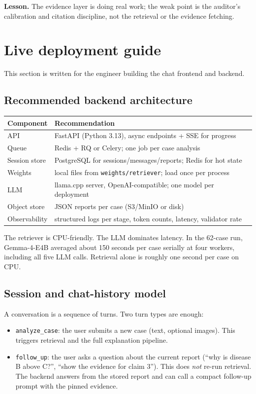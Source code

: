 \documentclass[11pt,a4paper]{article}
\newcommand{\code}[1]{\texttt{\small #1}}
\begin{document}
\textbf{Lesson.} The evidence layer is doing real work; the weak point is the
auditor's calibration and citation discipline, not the retrieval or the evidence
fetching.

\section{Live deployment guide}

This section is written for the engineer building the chat frontend and backend.

\subsection{Recommended backend architecture}

\begin{center}
\begin{tabular}{ll}
\toprule
Component & Recommendation\\
\midrule
API & FastAPI (Python 3.13), async endpoints + SSE for progress\\
Queue & Redis + RQ or Celery; one job per case analysis\\
Session store & PostgreSQL for sessions/messages/reports; Redis for hot state\\
Weights & local files from \code{weights/retriever}; load once per process\\
LLM & llama.cpp server, OpenAI-compatible; one model per deployment\\
Object store & JSON reports per case (S3/MinIO or disk)\\
Observability & structured logs per stage, token counts, latency, validator rate\\
\bottomrule
\end{tabular}
\end{center}

The retriever is CPU-friendly. The LLM dominates latency. In the 62-case run,
Gemma-4-E4B averaged about 150 seconds per case serially at four workers, including
all five LLM calls. Retrieval alone is roughly one second per case on CPU.

\subsection{Session and chat-history model}

A conversation is a sequence of turns. Two turn types are enough:

\begin{itemize}[leftmargin=1.4em]
\item \code{analyze\_case}: the user submits a new case (text, optional images).
This triggers retrieval and the full explanation pipeline.
\item \code{follow\_up}: the user asks a question about the current report
(``why is disease B above C?'', ``show the evidence for claim 3''). This does
\emph{not} re-run retrieval. The backend answers from the stored report and can
call a compact follow-up prompt with the pinned evidence.
\end{itemize}
\end{document}
